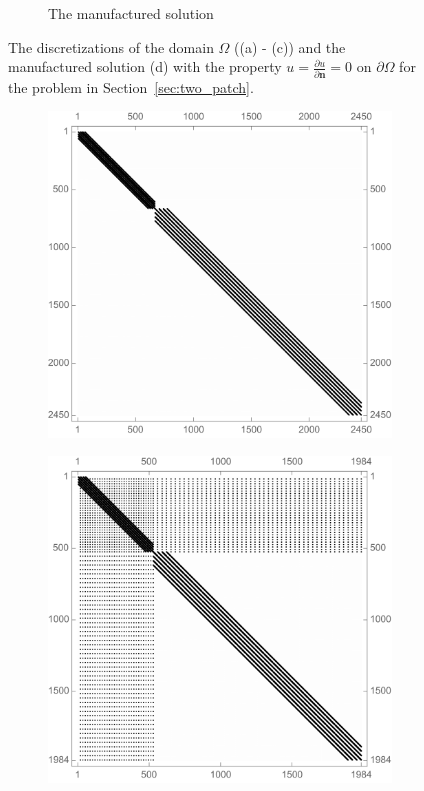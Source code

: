 \begin{figure}[ht]
\begin{subfigure}[t]{0.35\textwidth}
		\caption{The manufactured solution\vspace{3mm}}\label{fig:two_patch_biharmonic_problem_solution-plot}
	\end{subfigure}
	\caption{The discretizations of the domain $\Omega$ ((a) - (c)) and the manufactured solution (d) with the property $u=\frac{\partial{u}}{\partial{\mathbf{n}}}=0$ on $\partial{\Omega}$ for the problem in Section~\ref{sec:two_patch}.}\label{fig:two_patch_biharmonic_problem}
\end{figure}

\begin{figure}[ht]
	\centering
	\begin{subfigure}[b]{0.45\textwidth}
		\includegraphics[width=\textwidth]{sp}
		\caption{}
	\end{subfigure}
	\begin{subfigure}[b]{0.45\textwidth}
		\includegraphics[width=\textwidth]{stand_sp}

\end{subfigure}
\end{figure}
